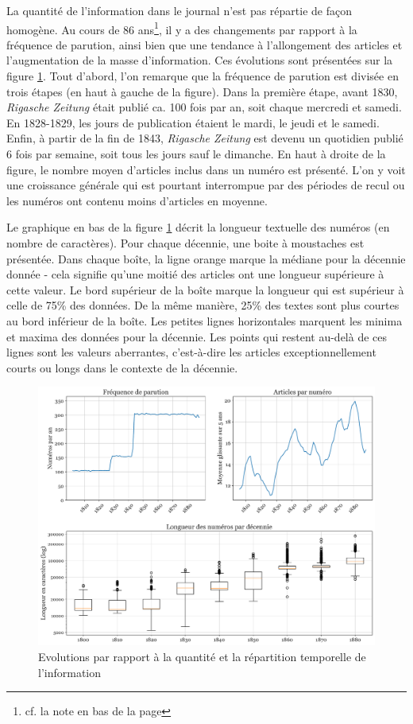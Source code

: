 \documentclass[a4paper,twoside,12pt]{article}
\begin{document}
La quantité de l'information dans le journal n'est pas répartie de façon homogène. Au cours de 86 ans\footnote{cf. la note en bas de la page \pageref{86_years}}, il y a des changements par rapport à la fréquence de parution, ainsi bien que une tendance à l'allongement des articles et l'augmentation de la masse d'information. Ces évolutions sont présentées sur la figure \ref{fig:text_mass}. Tout d'abord, l'on remarque que la fréquence de parution est divisée en trois étapes (en haut à gauche de la figure). Dans la première étape, avant 1830, \textit{Rigasche Zeitung} était publié ca. 100 fois par an, soit chaque mercredi et samedi. En 1828-1829, les jours de publication étaient le mardi, le jeudi et le samedi. Enfin, à partir de la fin de 1843, \textit{Rigasche Zeitung} est devenu un quotidien publié 6 fois par semaine, soit tous les jours sauf le dimanche. En haut à droite de la figure, le nombre moyen d'articles inclus dans un numéro est présenté. L'on y voit une croissance générale qui est pourtant interrompue par des périodes de recul ou les numéros ont contenu moins d'articles en moyenne.

Le graphique en bas de la figure \ref{fig:text_mass} décrit la longueur textuelle des numéros (en nombre de caractères). Pour chaque décennie, une \og boite à moustaches \fg{} est présentée. Dans chaque boîte, la ligne orange marque la médiane pour la décennie donnée - cela signifie qu'une moitié des articles ont une longueur supérieure à cette valeur. Le bord supérieur de la boîte marque la longueur qui est supérieur à celle de 75\% des données. De la même manière, 25\% des textes sont plus courtes au bord inférieur de la boîte. Les petites lignes horizontales marquent les minima et maxima des données pour la décennie. Les points qui restent au-delà de ces lignes sont les valeurs aberrantes, c'est-à-dire les articles exceptionnellement courts ou longs dans le contexte de la décennie.

\begin{figure}[h]
\centering
\captionsetup{justification=centering}
\includegraphics[width=\textwidth]{images/text_mass.pdf}
\caption{Evolutions par rapport à la quantité et la répartition temporelle de l'information}
\label{fig:text_mass}
\end{figure}
\end{document}
